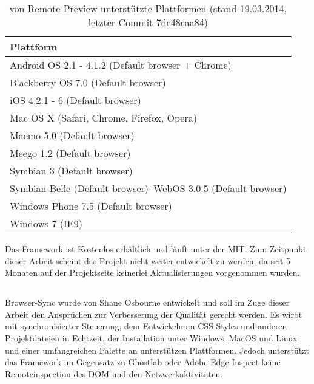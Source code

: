 	\begin{table}[H]
 		\centering
			\begin{tabular}{| p{13cm} |}
			
			\hline
				Plattform\\
			\hline
			\hline
				Android OS 2.1 - 4.1.2 (Default browser + Chrome)\\
				Blackberry OS 7.0 (Default browser)\\
				iOS 4.2.1 - 6 (Default browser)\\
				Mac OS X (Safari, Chrome, Firefox, Opera)\\
				Maemo 5.0 (Default browser)\\
				Meego 1.2 (Default browser)\\
				Symbian 3 (Default browser)\\
				Symbian Belle (Default browser)\
				WebOS 3.0.5 (Default browser)\\
				Windows Phone 7.5 (Default browser)\\	
				Windows 7 (IE9)\\
				\hline
				\end{tabular}
			\caption{von Remote Preview unterstützte Plattformen (stand 19.03.2014, letzter \Gls{Commit} 7dc48caa84)}
	\end{table}
	Das \Gls{Framework} ist Kostenlos erhältlich und läuft unter der \Gls{MIT}. Zum Zeitpunkt dieser Arbeit scheint das Projekt nicht 		weiter entwickelt zu werden, da seit 5 Monaten auf der Projektseite keinerlei Aktualisierungen vorgenommen wurden.

		
	\subsection{}
	Browser-Sync wurde von Shane Osbourne entwickelt und soll im Zuge dieser Arbeit den Ansprüchen zur Verbesserung der Qualität gerecht werden. Es wirbt mit synchronisierter Steuerung, dem Entwickeln an CSS Styles und anderen Projektdateien in Echtzeit, der Installation unter Windows, MacOS und Linux und einer umfangreichen Palette an unterstützen Plattformen. Jedoch unterstützt das \Gls{Framework} im Gegensatz zu Ghostlab oder Adobe Edge Inspect keine Remoteinspection des \Gls{DOM} und den Netzwerkaktivitäten.
	
